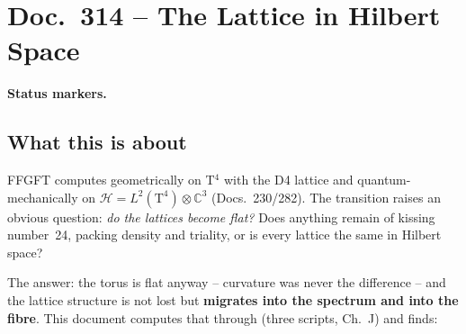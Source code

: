 \maketitle
\tableofcontents

\chapter*{Doc.~314 -- The Lattice in Hilbert Space}

\medskip\noindent\textbf{Status markers.}


\section*{What this is about}

FFGFT computes geometrically on T$^4$ with the D4 lattice and
quantum-mechanically on $\mathcal{H} = L^2(\text{T}^4)\otimes
\mathbb{C}^3$ (Docs.~230/282). The transition raises an obvious
question: \emph{do the lattices become flat?} Does anything remain of
kissing number~24, packing density and triality, or is every lattice
the same in Hilbert space?

The answer: the torus is flat anyway -- curvature was never the
difference -- and the lattice structure is not lost but
\textbf{migrates into the spectrum and into the fibre}. This document
computes that through (three scripts, Ch.~J) and finds:

